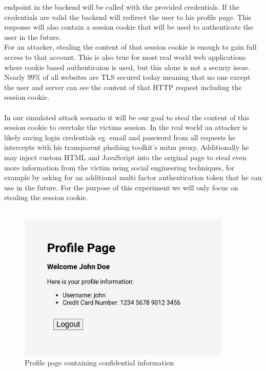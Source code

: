 \documentclass[12pt]{report}
\begin{document}
endpoint in the backend will be called with the provided credentials. If the credentials are valid the backend
will redirect the user to his profile page. This response will also contain a session cookie that will be used
to authenticate the user in the future.\\For an attacker, stealing the content of that session cookie is enough to
gain full access to that account. This is also true for most real world web applications where cookie based authenticaion
is used, but this alone is not a securiy issue. Nearly 99\% of all websites are TLS secured today \cite{tlsPercentage} meaning
that no one except the user and server can see the content of that HTTP request including the session cookie.\\ \\

In our simulated attack scenario it will be our goal to steal the content of this session cookie to overtake the victims
session. In the real world an attacker is likely saving login credentials eg. email and password from all requests he intercepts
with his transparent phsihing toolkit's mitm proxy. Additionally he may inject custom HTML and JavaScript into the original page
to steal even more information from the victim using social engineering techniques, for example by asking for an additional
multi factor authentication token that he can use in the future. For the purpose of this experiment we will only focus on
stealing the session cookie.\\ \\

\begin{figure}[!htb]
  \centering
  \includegraphics[height=7cm]{./images/profile_page.png}
  \caption{Profile page containing confidential information}
\end{figure}
\end{document}
